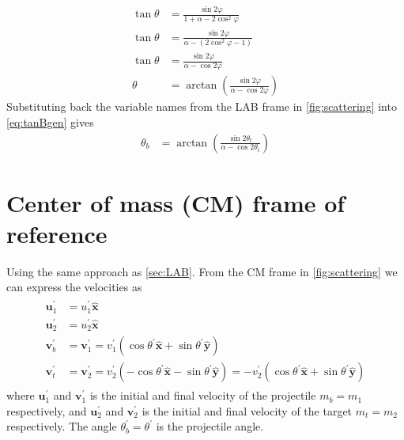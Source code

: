 \documentclass[twoside,english]{uiofysmaster/uiofysmaster}
\let\orgautoref\autoref
\renewcommand{\autoref}
        {%
		 \def\sectionautorefname{Section}%
		 \def\subsectionautorefname{Section}%
		 \def\subsubsectionautorefname{Section}%
		 \def\chapterautorefname{Chapter}%
          \orgautoref}
\begin{document}
\begin{appendices}
\begin{align}
	\tan \theta &= \frac{\sin 2\varphi}{1 + \alpha - 2 \cos^2 \varphi}  \nonumber\\
	\tan \theta &= \frac{\sin 2\varphi}{\alpha - (2 \cos^2 \varphi - 1)}  \nonumber\\
	\tan \theta &= \frac{\sin 2\varphi}{\alpha - \cos 2\varphi}  \nonumber\\
	\theta &= \arctan \left( \frac{\sin 2\varphi}{\alpha - \cos 2\varphi} \right)
\end{align}
Substituting back the variable names from the LAB frame in \autoref{fig:scattering} into \autoref{eq:tanBgen} gives
\begin{align}\label{eq:tanB}
	\theta_b &= \arctan \left( \frac{\sin 2\theta_t}{\alpha - \cos 2\theta_t} \right)
\end{align}


\section{Center of mass (CM) frame of reference}
Using the same approach as \autoref{sec:LAB}. 
From the CM frame in \autoref{fig:scattering} we can express the velocities as
\begin{align}\label{eq:2p-CM-collision}
\begin{split}
	 \boldsymbol{u}_1^{'} &= u_1^{'} \boldsymbol{\hat{x}} \\
	 \boldsymbol{u}_2^{'} &= u_2^{'} \boldsymbol{\hat{x}} \\
	 \boldsymbol{v}_b^{'} &= \boldsymbol{v}_1^{'} = v_1^{'} (\cos \theta^{'} \boldsymbol{\hat{x}} + \sin \theta^{'} \boldsymbol{\hat{y}}) \\
	\boldsymbol{v}_t^{'} &= \boldsymbol{v}_2^{'} = v_2^{'} (-\cos \theta^{'} \boldsymbol{\hat{x}} - \sin \theta^{'} \boldsymbol{\hat{y}}) = -v_2^{'} (\cos \theta^{'} \boldsymbol{\hat{x}} + \sin \theta^{'} \boldsymbol{\hat{y}})
\end{split}
\end{align}
where $\boldsymbol{u}_1^{'}$ and $\boldsymbol{v}_1^{'}$ is the initial and final velocity of the projectile $m_b = m_1$ respectively, and $\boldsymbol{u}_2^{'}$ and $\boldsymbol{v}_2^{'}$ is the initial and final velocity of the target $m_t = m_2$ respectively. 
The angle $\theta_b^{'} = \theta^{'}$ is the projectile angle. 


\end{appendices}
\end{document}
